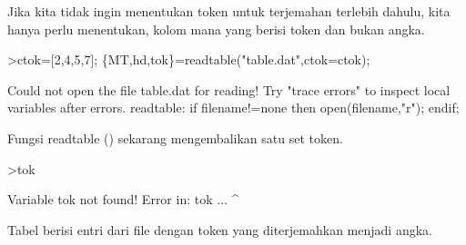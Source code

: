 \documentclass[a4paper,10pt]{article}
\begin{document}
\begin{eulernotebook}
\begin{eulercomment}
\begin{eulercomment}
\begin{eulercomment}
\begin{eulercomment}
\begin{eulercomment}
\begin{eulercomment}
\begin{eulercomment}
\begin{eulercomment}
\begin{eulercomment}
\begin{eulercomment}
\begin{eulercomment}
Jika kita tidak ingin menentukan token untuk terjemahan terlebih
dahulu, kita hanya perlu menentukan, kolom mana yang berisi token dan
bukan angka.
\end{eulercomment}
\begin{eulerprompt}
>ctok=[2,4,5,7]; \{MT,hd,tok\}=readtable("table.dat",ctok=ctok);  
\end{eulerprompt}
\begin{euleroutput}
  Could not open the file
  table.dat
  for reading!
  Try "trace errors" to inspect local variables after errors.
  readtable:
      if filename!=none then open(filename,"r"); endif;
\end{euleroutput}
\begin{eulercomment}
Fungsi readtable () sekarang mengembalikan satu set token.
\end{eulercomment}
\begin{eulerprompt}
>tok
\end{eulerprompt}
\begin{euleroutput}
  Variable tok not found!
  Error in:
  tok ...
     ^
\end{euleroutput}
\begin{eulercomment}
Tabel berisi entri dari file dengan token yang diterjemahkan menjadi
angka.


\end{eulercomment}
\end{eulercomment}
\end{eulercomment}
\end{eulercomment}
\end{eulercomment}
\end{eulercomment}
\end{eulercomment}
\end{eulercomment}
\end{eulercomment}
\end{eulercomment}
\end{eulercomment}
\end{eulernotebook}
\end{document}
